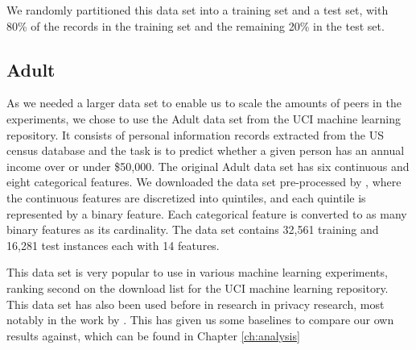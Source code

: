 We randomly partitioned this data set into a training set and a test set, with 80\% of the records in the training set and the remaining 20\% in the test set.


%

\subsection{Adult}
As we needed a larger data set to enable us to scale the amounts of peers in the experiments, we chose to use the Adult data set from the UCI machine learning repository.  It consists of personal information records extracted from the US census database and the task is to predict whether a given person has an annual income over or under \$50,000. The original Adult data set has six continuous and eight categorical features. We
downloaded the data set pre-processed by \cite{platt1999fast}, where the continuous features are discretized into quintiles, and each quintile is represented by a binary feature. Each categorical feature is converted to as many binary features as its cardinality. The data set contains 32,561 training and 16,281 test instances each with 14 features.

This data set is very popular to use in various machine learning experiments, ranking second on the download list for the UCI machine learning repository. This data set has also been used before in research in privacy research, most notably in the work by \cite{pathak2010diffprivhomo}. This has given us some baselines to compare our own results against, which can be found in Chapter \ref{ch:analysis}


